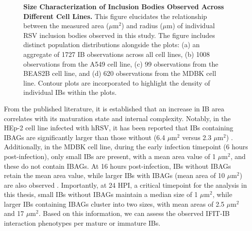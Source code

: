 \begin{figure}
\begin{subfigure}{0.495\textwidth}
    \end{subfigure}
    \caption[Size Characterization of Inclusion Bodies Observed Across Different Cell Lines.]{\textbf{Size Characterization of Inclusion Bodies Observed Across Different Cell Lines.} This figure elucidates the relationship between the measured area (\(\mu \mbox{m}^2\)) and radius (\(\mu \mbox{m}\)) of individual RSV inclusion bodies observed in this study. The figure includes distinct population distributions alongside the plots: (a) an aggregate of 1727 IB observations across all cell lines, (b) 1008 observations from the A549 cell line, (c) 99 observations from the BEAS2B cell line, and (d) 620 observations from the MDBK cell line. Contour plots are incorporated to highlight the density of individual IBs within the plots.}
    \label{fig:Size Characterization of Inclusion Bodies Observed Across Different Cell Lines}
\end{figure}

From the published literature, it is established that an increase in IB area correlates with its maturation state and internal complexity. Notably, in the HEp-2 cell line infected with hRSV, it has been reported that IBs containing IBAGs are significantly larger than those without (6.4 \(\mu \mbox{m}^2\) versus 2.3 \(\mu \mbox{m}^2\)) \cite{Rincheval2017FunctionalVirus}. Additionally, in the MDBK cell line, during the early infection timepoint (6 hours post-infection), only small IBs are present, with a mean area value of 1 \(\mu \mbox{m}^2\), and these do not contain IBAGs. At 16 hours post-infection, IBs without IBAGs retain the mean area value, while larger IBs with IBAGs (mean area of 10 \(\mu \mbox{m}^2\)) are also observed \cite{Jobe2021BovineResponses}. Importantly, at 24 HPI, a critical timepoint for the analysis in this thesis, small IBs without IBAGs maintain a median size of 1 \(\mu \mbox{m}^2\), while larger IBs containing IBAGs cluster into two sizes, with mean areas of 2.5 \(\mu \mbox{m}^2\) and 17 \(\mu \mbox{m}^2\). Based on this information, we can assess the observed IFIT-IB interaction phenotypes per mature or immature IBs.

